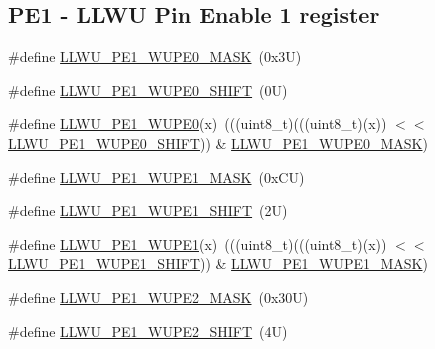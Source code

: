 \subsection*{P\+E1 -\/ L\+L\+WU Pin Enable 1 register}
\begin{DoxyCompactItemize}
\item 
\#define \mbox{\hyperlink{group___l_l_w_u___register___masks_ga6ed6c56a8797caa64d27eb915c164dad}{L\+L\+W\+U\+\_\+\+P\+E1\+\_\+\+W\+U\+P\+E0\+\_\+\+M\+A\+SK}}~(0x3\+U)
\item 
\#define \mbox{\hyperlink{group___l_l_w_u___register___masks_ga234c02ee9c2b3e3e248c90473e922336}{L\+L\+W\+U\+\_\+\+P\+E1\+\_\+\+W\+U\+P\+E0\+\_\+\+S\+H\+I\+FT}}~(0\+U)
\item 
\#define \mbox{\hyperlink{group___l_l_w_u___register___masks_ga61f1d3c27404e82bdebb9627e83f35dd}{L\+L\+W\+U\+\_\+\+P\+E1\+\_\+\+W\+U\+P\+E0}}(x)~(((uint8\+\_\+t)(((uint8\+\_\+t)(x)) $<$$<$ \mbox{\hyperlink{group___l_l_w_u___register___masks_ga234c02ee9c2b3e3e248c90473e922336}{L\+L\+W\+U\+\_\+\+P\+E1\+\_\+\+W\+U\+P\+E0\+\_\+\+S\+H\+I\+FT}})) \& \mbox{\hyperlink{group___l_l_w_u___register___masks_ga6ed6c56a8797caa64d27eb915c164dad}{L\+L\+W\+U\+\_\+\+P\+E1\+\_\+\+W\+U\+P\+E0\+\_\+\+M\+A\+SK}})
\item 
\#define \mbox{\hyperlink{group___l_l_w_u___register___masks_gac0c417f78992f2ebaca7267ef06d888a}{L\+L\+W\+U\+\_\+\+P\+E1\+\_\+\+W\+U\+P\+E1\+\_\+\+M\+A\+SK}}~(0x\+C\+U)
\item 
\#define \mbox{\hyperlink{group___l_l_w_u___register___masks_gaa9b8224f389f9c3d4f13772d8e5fbeee}{L\+L\+W\+U\+\_\+\+P\+E1\+\_\+\+W\+U\+P\+E1\+\_\+\+S\+H\+I\+FT}}~(2\+U)
\item 
\#define \mbox{\hyperlink{group___l_l_w_u___register___masks_gab35a751adac37592806af18a4f6e3837}{L\+L\+W\+U\+\_\+\+P\+E1\+\_\+\+W\+U\+P\+E1}}(x)~(((uint8\+\_\+t)(((uint8\+\_\+t)(x)) $<$$<$ \mbox{\hyperlink{group___l_l_w_u___register___masks_gaa9b8224f389f9c3d4f13772d8e5fbeee}{L\+L\+W\+U\+\_\+\+P\+E1\+\_\+\+W\+U\+P\+E1\+\_\+\+S\+H\+I\+FT}})) \& \mbox{\hyperlink{group___l_l_w_u___register___masks_gac0c417f78992f2ebaca7267ef06d888a}{L\+L\+W\+U\+\_\+\+P\+E1\+\_\+\+W\+U\+P\+E1\+\_\+\+M\+A\+SK}})
\item 
\#define \mbox{\hyperlink{group___l_l_w_u___register___masks_ga97e8e2fc8ce673f6b4625d307bc94b4a}{L\+L\+W\+U\+\_\+\+P\+E1\+\_\+\+W\+U\+P\+E2\+\_\+\+M\+A\+SK}}~(0x30\+U)
\item 
\#define \mbox{\hyperlink{group___l_l_w_u___register___masks_ga0b1bb86eb31a82a18ad1491b0305000b}{L\+L\+W\+U\+\_\+\+P\+E1\+\_\+\+W\+U\+P\+E2\+\_\+\+S\+H\+I\+FT}}~(4\+U)

\end{DoxyCompactItemize}
